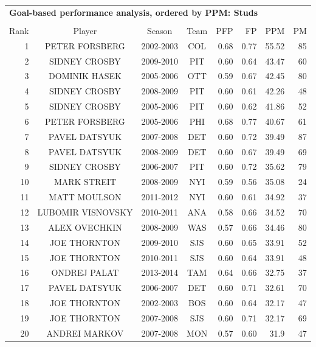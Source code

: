\documentclass[11pt,xcolor=svgnames]{beamer}
\begin{document}
\begin{frame}

\scriptsize
	\begin{tabular}{r c c c|r r r r }
		\multicolumn{8}{l}{\bf Goal-based performance analysis, ordered by PPM: Studs} \\ \\
		Rank & Player & Season  & Team & PFP & FP & PPM & PM \\ \hline
		\rule{0pt}{4ex} 
		1&PETER FORSBERG&2002-2003&COL&0.68&0.77&55.52&85\\
		2&SIDNEY CROSBY&2009-2010&PIT&0.60&0.64&43.47&60\\
		3&DOMINIK HASEK&2005-2006&OTT&0.59&0.67&42.45&80\\
		4&SIDNEY CROSBY&2008-2009&PIT&0.60&0.61&42.26&48\\
		5&SIDNEY CROSBY&2005-2006&PIT&0.60&0.62&41.86&52\\
		6&PETER FORSBERG&2005-2006&PHI&0.68&0.77&40.67&61\\
		7&PAVEL DATSYUK&2007-2008&DET&0.60&0.72&39.49&87\\
		8&PAVEL DATSYUK&2008-2009&DET&0.60&0.67&39.49&69\\
		9&SIDNEY CROSBY&2006-2007&PIT&0.60&0.72&35.62&79\\
		10&MARK STREIT&2008-2009&NYI&0.59&0.56&35.08&24\\
		11&MATT MOULSON&2011-2012&NYI&0.60&0.61&34.92&37\\
		12&LUBOMIR VISNOVSKY&2010-2011&ANA&0.58&0.66&34.52&70\\
		13&ALEX OVECHKIN&2008-2009&WAS&0.57&0.66&34.46&80\\
		14&JOE THORNTON&2009-2010&SJS&0.60&0.65&33.91&52\\
		15&JOE THORNTON&2010-2011&SJS&0.60&0.64&33.91&48\\
		16&ONDREJ PALAT&2013-2014&TAM&0.64&0.66&32.75&37\\
		17&PAVEL DATSYUK&2006-2007&DET&0.60&0.71&32.61&70\\
		18&JOE THORNTON&2002-2003&BOS&0.60&0.64&32.17&47\\
		19&JOE THORNTON&2007-2008&SJS&0.60&0.71&32.17&69\\
		20&ANDREI MARKOV&2007-2008&MON&0.57&0.60&31.9&47\\
\end{tabular}
\end{frame}
\end{document}
